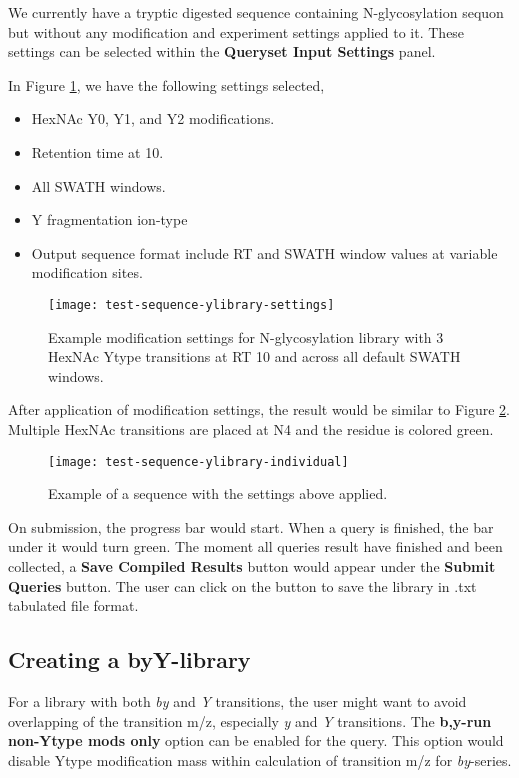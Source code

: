 \documentclass[../manual.tex]{subfiles}
\begin{document}
We currently have a tryptic digested sequence containing N-glycosylation sequon but without any modification and experiment settings applied to it. These settings can be selected within the \textbf{Queryset Input Settings} panel.

In Figure \ref{fig:testsequenceylibrarysettings}, we have the following settings selected,
\begin{itemize}
	\item HexNAc Y0, Y1, and Y2 modifications.
	\item Retention time at 10.
	\item All SWATH windows.
	\item Y fragmentation ion-type
	\item Output sequence format include RT and SWATH window values at variable modification sites.
\end{itemize}
\begin{figure}[H]
	\centering
	\begin{framed}
        \centering
        \begin{adjustbox}{width=1\textwidth}
			\texttt{[image: test-sequence-ylibrary-settings]}
		\end{adjustbox}
		\caption{Example modification settings for N-glycosylation library with 3 HexNAc Ytype transitions at RT 10 and across all default SWATH windows.}\label{fig:testsequenceylibrarysettings}
	\end{framed}
\end{figure}
After application of modification settings, the result would be similar to Figure \ref{fig:testsequenceylibraryindividual}. Multiple HexNAc transitions are placed at N4 and the residue is colored green.
\begin{figure}[H]
	\centering
	\begin{framed}
        \centering
        \begin{adjustbox}{width=1\textwidth}
			\texttt{[image: test-sequence-ylibrary-individual]}
		\end{adjustbox}
		\caption{Example of a sequence with the settings above applied.}\label{fig:testsequenceylibraryindividual}
	\end{framed}
\end{figure}

On submission, the progress bar would start. When a query is finished, the bar under it would turn green. The moment all queries result have finished and been collected, a \textbf{Save Compiled Results} button would appear under the \textbf{Submit Queries} button. The user can click on the button to save the library in .txt tabulated file format.

\subsection{Creating a byY-library}
For a library with both \emph{by} and \emph{Y} transitions, the user might want to avoid overlapping of the transition m/z, especially \emph{y} and \emph{Y} transitions. The \textbf{b,y-run non-Ytype mods only} option can be enabled for the query. This option would disable Ytype modification mass within calculation of transition m/z for \emph{by}-series.
\end{document}
